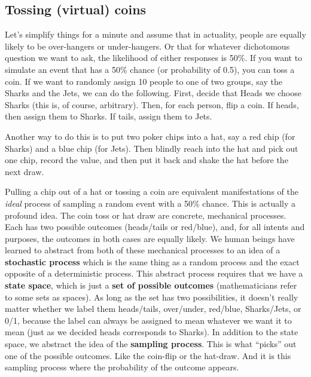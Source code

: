 \documentclass[openany]{book}
\begin{document}
\hypertarget{tossing-virtual-coins}{%
\subsection*{Tossing (virtual) coins}\label{tossing-virtual-coins}}

Let's simplify things for a minute and assume that in actuality, people are equally likely to be over-hangers or under-hangers. Or that for whatever dichotomous question we want to ask, the likelihood of either responses is 50\%.
If you want to simulate an event that has a 50\% chance (or probability of 0.5), you can toss a coin. If we want to randomly assign 10 people to one of two groups, say the Sharks and the Jets, we can do the following. First, decide that Heads we choose Sharks (this is, of course, arbitrary). Then, for each person, flip a coin. If heads, then assign them to Sharks. If tails, assign them to Jets.

Another way to do this is to put two poker chips into a hat, say a red chip (for Sharks) and a blue chip (for Jets). Then blindly reach into the hat and pick out one chip, record the value, and then put it back and shake the hat before the next draw.

Pulling a chip out of a hat or tossing a coin are equivalent manifestations of the \emph{ideal} process of sampling a random event with a 50\% chance. This is actually a profound idea. The coin toss or hat draw are concrete, mechanical processes. Each has two possible outcomes (heads/tails or red/blue), and, for all intents and purposes, the outcomes in both cases are equally likely. We human beings have learned to abstract from both of these mechanical processes to an idea of a \textbf{stochastic process} which is the same thing as a random process and the exact opposite of a deterministic process. This abstract process requires that we have a \textbf{state space}, which is just a \textbf{set of possible outcomes} (mathematicians refer to some sets as spaces). As long as the set has two possibilities, it doesn't really matter whether we label them heads/tails, over/under, red/blue, Sharks/Jets, or 0/1, because the label can always be assigned to mean whatever we want it to mean (just as we decided heads corresponds to Sharks). In addition to the state space, we abstract the idea of the \textbf{sampling process}. This is what ``picks'' out one of the possible outcomes. Like the coin-flip or the hat-draw. And it is this sampling process where the probability of the outcome appears.
\end{document}
